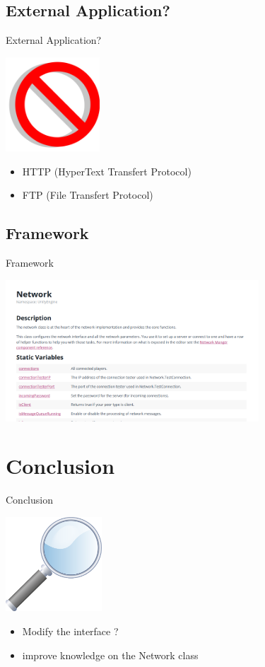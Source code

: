 \documentclass[a4paper,10pt]{beamer}
\begin{document}
		\subsection{External Application?}
		
			\begin{frame}{External Application?}
				\centerline{\includegraphics[height=100pt]{images/network/no.png}}
				\begin{itemize}
					\item HTTP (HyperText Transfert Protocol)
					\item FTP (File Transfert Protocol)
				\end{itemize}
			\end{frame}
		
		\subsection{Framework}
		
			\begin{frame}{Framework}
				\centerline{\includegraphics[height=150pt]{images/network/networkclass.png}}
			\end{frame}
	
	\section{Conclusion}
	
		\begin{frame}{Conclusion}
			\centerline{\includegraphics[height=100pt]{images/conclusion/loupe.png}}
			\begin{itemize}
				\item Modify the interface ?
				\item improve knowledge on the Network class
			\end{itemize}
		\end{frame}
\end{document}
